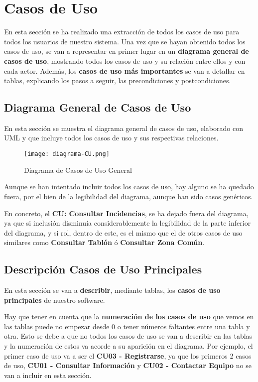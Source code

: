 \section{Casos de Uso}
En esta sección se ha realizado una extracción de todos los casos de uso para todos los usuarios de nuestro sistema. Una vez que se hayan obtenido todos los casos de uso, se van a representar en primer lugar en un \textbf{diagrama general de casos de uso}, mostrando todos los casos de uso y su relación entre ellos y con cada actor. Además, los \textbf{casos de uso más importantes} se van a detallar en tablas, explicando los pasos a seguir, las precondiciones y postcondiciones.

\subsection{Diagrama General de Casos de Uso}
En esta sección se muestra el diagrama general de casos de uso, elaborado con UML y que incluye todos los casos de uso y sus respectivas relaciones.

\begin{figure}[H]
	\centering
	\texttt{[image: diagrama-CU.png]}
	\caption{Diagrama de Casos de Uso General}
\end{figure}

Aunque se han intentado incluir todos los casos de uso, hay alguno se ha quedado fuera, por el bien de la legibilidad del diagrama, aunque han sido casos genéricos. 

En concreto, el \textbf{CU: Consultar Incidencias}, se ha dejado fuera del diagrama, ya que si inclusión disminuía considerablemente la legibilidad de la parte inferior del diagrama, y si rol, dentro de este, es el mismo que el de otros casos de uso similares como \textbf{Consultar Tablón} ó \textbf{Consultar Zona Común}.

\subsection{Descripción Casos de Uso Principales}
En esta sección se van a \textbf{describir}, mediante tablas, los \textbf{casos de uso principales} de nuestro software. 

Hay que tener en cuenta que la \textbf{numeración de los casos de uso} que vemos en las tablas puede no empezar desde 0 o tener números faltantes entre una tabla y otra. Esto se debe a que no todos los casos de uso se van a describir en las tablas y la numeración de estos va acorde a su aparición en el diagrama. Por ejemplo, el primer caso de uso va a ser el \textbf{CU03 - Registrarse}, ya que los primeros 2 casos de uso, \textbf{CU01 - Consultar Información} y \textbf{CU02 - Contactar Equipo} no se van a incluir en esta sección.

